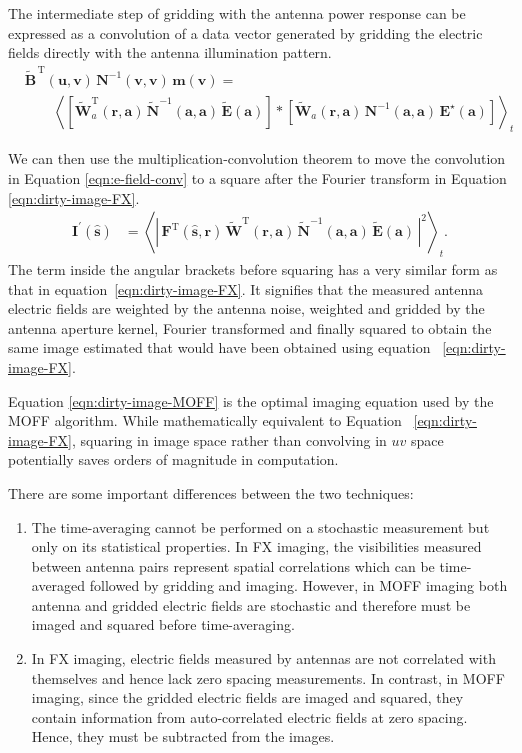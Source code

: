 \documentclass[a4paper,fleqn,usenatbib]{../mnras}
\begin{document}
The intermediate step of gridding with the antenna power response can be 
expressed as a convolution of a data vector generated by gridding the electric fields 
directly with the antenna illumination pattern.
\begin{align}
&\widetilde{\mathbf{B}}^{\,\textrm{T}}(\mathbf{u},\mathbf{v})\,\mathbf{N}^{-1}(\mathbf{v} ,\mathbf{v})\,\mathbf{m}(\mathbf{v})=\nonumber\\
&\qquad\left\langle \left[\widetilde{\mathbf{W}}^\textrm{T}_a(\mathbf{r},\mathbf{a})\, \widetilde{\mathbf{N}}^{-1}\!(\mathbf{a},\mathbf{a})\, \widetilde{\mathbf{E}}(\mathbf{a})\right]
\ast\left[\widetilde{\mathbf{W}}_a(\mathbf{r},\mathbf{a})\, \mathbf{N}^{-1}\!(\mathbf{a},\mathbf{a})\, \mathbf{E}^\star(\mathbf{a})\right]\right\rangle_t\label{eqn:e-field-conv}
\end{align}

We can then use the multiplication-convolution theorem to move the convolution in 
Equation \ref{eqn:e-field-conv} to a square after the Fourier transform in Equation 
\ref{eqn:dirty-image-FX}.
\begin{align}
  \mathbf{I}^\prime(\hat{\mathbf{s}}) &= \left\langle \left|\,\mathbf{F}^\textrm{T}(\hat{\mathbf{s}},\mathbf{r})\,\widetilde{\mathbf{W}}^\textrm{T}(\mathbf{r},\mathbf{a})\,\widetilde{\mathbf{N}}^{-1}(\mathbf{a},\mathbf{a})\,\widetilde{\mathbf{E}}(\mathbf{a})\,\right|^2\right\rangle_t. \label{eqn:dirty-image-MOFF}
\end{align}
The term inside the angular brackets before squaring has a very similar form as
that in equation~\ref{eqn:dirty-image-FX}. It signifies that the measured antenna
electric fields are weighted by the antenna noise, weighted and gridded by the
antenna aperture kernel, Fourier transformed and finally squared to obtain the
same image estimated that would have been obtained using equation~
\ref{eqn:dirty-image-FX}. 

Equation \ref{eqn:dirty-image-MOFF} is the optimal imaging equation used by the 
MOFF algorithm. While mathematically equivalent to Equation~
\ref{eqn:dirty-image-FX}, squaring in image space rather than convolving in $uv$ 
space potentially saves orders of magnitude in computation.

There are some important differences between the two techniques:
\begin{enumerate}
\item The time-averaging cannot be performed on a stochastic measurement but
  only on its statistical properties. In FX imaging, the visibilities measured
  between antenna pairs represent spatial correlations which can be time-averaged
  followed by gridding and imaging. However, in MOFF imaging both
  antenna and gridded electric fields are stochastic and therefore must be
  imaged and squared before time-averaging. 
\item In FX imaging, electric fields measured by antennas are not correlated with
  themselves and hence lack zero spacing measurements. In contrast, in MOFF
  imaging, since the gridded electric fields are imaged and squared, they
  contain information from auto-correlated electric fields at zero spacing.
  Hence, they must be subtracted from the images.
\end{enumerate} 
\end{document}
